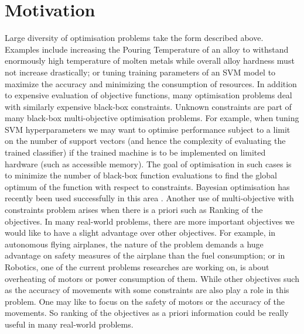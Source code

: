 \section{Motivation}\label{sec:mot}
Large diversity of optimisation problems take the form described above. Examples include increasing the Pouring Temperature of an alloy to withstand enormously high temperature of molten metals while overall alloy hardness must not increase drastically; or tuning training parameters of an SVM‌ model to maximize the accuracy and minimizing the consumption of resources. In addition to expensive evaluation of objective functions, many optimisation problems deal with similarly expensive black-box constraints. Unknown constraints are part of many black-box multi-objective optimisation problems. For example, when tuning SVM hyperparameters we may want to optimise performance subject to a limit on the number of support vectors (and hence the complexity of evaluating the trained classifier) if the trained machine is to be implemented on limited hardware (such as accessible memory). The goal of optimisation
in such cases is to minimize the number of black-box function evaluations to find the global optimum of the function with respect to constraints. Bayesian optimisation has recently been used successfully in this area \cite{MajidPaper2018}.
Another use of multi-objective with constraints problem arises when there is a priori such as Ranking of the objectives. In many real-world problems, there are more important objectives we would like to have a slight advantage over other objectives. For example, in autonomous flying airplanes, the nature of the problem demands a huge advantage on safety measures of the airplane than the fuel consumption; or in Robotics, one of the current problems researches are working on, is about overheating of motors or power consumption of them. While other objectives such as the accuracy of movements with some constraints are also play a role in this problem. One may like to focus on the safety of motors or the accuracy of the movements. So ranking of the objectives as a priori information could be really useful in many real-world problems.

